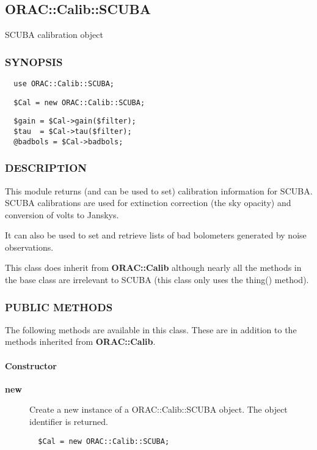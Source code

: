 \subsection{ORAC::Calib::SCUBA\label{ORAC::Calib::SCUBA}}


SCUBA calibration object

\subsubsection*{SYNOPSIS\label{ORAC::Calib::SCUBA_SYNOPSIS}}
\begin{verbatim}
  use ORAC::Calib::SCUBA;
\end{verbatim}
\begin{verbatim}
  $Cal = new ORAC::Calib::SCUBA;
\end{verbatim}
\begin{verbatim}
  $gain = $Cal->gain($filter);
  $tau  = $Cal->tau($filter);
  @badbols = $Cal->badbols;
\end{verbatim}
\subsubsection*{DESCRIPTION\label{ORAC::Calib::SCUBA_DESCRIPTION}}


This module returns (and can be used to set) calibration information
for SCUBA. SCUBA calibrations are used for extinction correction
(the sky opacity) and conversion of volts to Janskys.



It can also be used to set and retrieve lists of bad bolometers generated
by noise observations.



This class does inherit from \textbf{ORAC::Calib} although nearly all the
methods in the base class are irrelevant to SCUBA (this class only
uses the thing() method).

\subsubsection*{PUBLIC METHODS\label{ORAC::Calib::SCUBA_PUBLIC_METHODS}}


The following methods are available in this class.
These are in addition to the methods inherited from \textbf{ORAC::Calib}.

\paragraph*{Constructor\label{ORAC::Calib::SCUBA_Constructor}}
\begin{description}

\item[\textbf{new}] \mbox{}

Create a new instance of a ORAC::Calib::SCUBA object.
The object identifier is returned.

\begin{verbatim}
  $Cal = new ORAC::Calib::SCUBA;
\end{verbatim}
\end{description}
